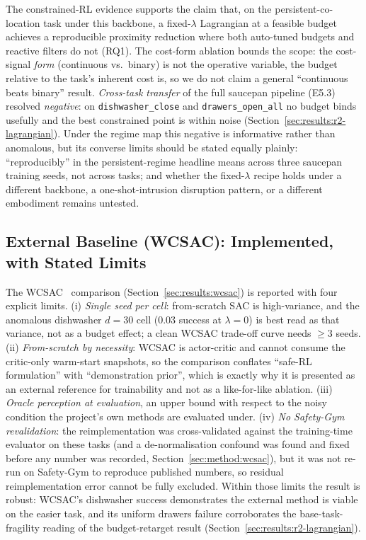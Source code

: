 \documentclass[11pt,a4paper]{report}
\begin{document}
The constrained-RL evidence supports the claim that, on the
persistent-co-location task under this backbone, a fixed-$\lambda$
Lagrangian at a feasible budget achieves a reproducible proximity
reduction where both auto-tuned budgets and reactive filters do not
(RQ1). The cost-form ablation bounds the scope: the cost-signal
\emph{form} (continuous vs.\ binary) is not the operative variable,
the budget relative to the task's inherent cost is, so we do not
claim a general ``continuous beats binary'' result. \emph{Cross-task
transfer} of the full saucepan pipeline (E5.3) resolved
\emph{negative}: on \texttt{dishwasher\_close} and
\texttt{drawers\_open\_all} no budget binds usefully and the best
constrained point is within noise
(Section~\ref{sec:results:r2-lagrangian}). Under the regime map this
negative is informative rather than anomalous, but its converse
limits should be stated equally plainly: ``reproducibly'' in the
persistent-regime headline means across three saucepan training
seeds, not across
tasks; and whether the fixed-$\lambda$ recipe holds under a
different backbone, a one-shot-intrusion disruption pattern, or a
different embodiment remains untested.

\subsection{External Baseline (WCSAC): Implemented, with Stated Limits}
\label{sec:disc:wcsac-honest}

The WCSAC~\cite{yang2021wcsac} comparison
(Section~\ref{sec:results:wcsac}) is reported with four explicit
limits. (i) \emph{Single seed per cell}: from-scratch SAC is
high-variance, and the anomalous dishwasher $d{=}30$ cell ($0.03$
success at $\lambda = 0$) is best read as that variance, not as a
budget effect; a clean WCSAC trade-off curve needs $\geq 3$ seeds.
(ii) \emph{From-scratch by necessity}: WCSAC is actor-critic and
cannot consume the critic-only warm-start snapshots, so the
comparison conflates ``safe-RL formulation'' with ``demonstration
prior'', which is exactly why it is presented as an external
reference for trainability and not as a like-for-like ablation.
(iii) \emph{Oracle perception at evaluation}, an upper bound with
respect to the noisy condition the project's own methods are
evaluated under. (iv) \emph{No Safety-Gym revalidation}: the
reimplementation was cross-validated against the training-time
evaluator on these tasks (and a de-normalisation confound was found
and fixed before any number was recorded,
Section~\ref{sec:method:wcsac}), but it was not re-run on Safety-Gym
to reproduce published numbers, so residual reimplementation error
cannot be fully excluded. Within those limits the result is robust:
WCSAC's dishwasher success demonstrates the external method is
viable on the easier task, and its uniform drawers failure
corroborates the base-task-fragility reading of the budget-retarget
result (Section~\ref{sec:results:r2-lagrangian}).
\end{document}
